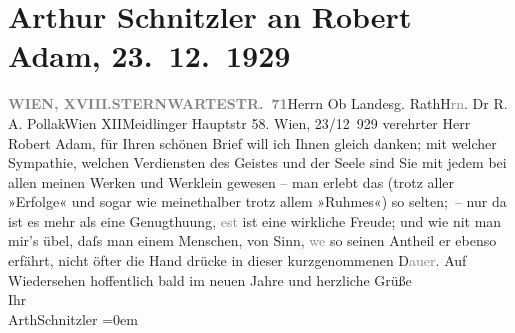 

         
         \renewcommand{\erwaehntePersonen}{Personen: Robert Adam}
         \renewcommand{\erwaehnteOrte}{Orte: Meidlinger Hauptstraße, Sternwartestraße 71, Wien, XII., Meidling, XVIII., Währing}
         \renewcommand{\erwaehnteWerke}{}
               \section[Arthur Schnitzler an Robert Adam, 23. 12. 1929]{ Arthur Schnitzler an Robert Adam, 23. 12. 1929}\nopagebreak{}\rehead{ }\begin{ledgroupsized}[t]{13cm}\normalsize\beginnumbering{} \toendnotes[C]{\smallbreak\pagebreak[2]} 
\toendnotes[C]{\smallbreak}\pstart{}{\pb}\label{T_L02528-1v}\label{T_L02528-1h}\pend{}\pstart{}\textcolor{gray}{\textbf{WIEN, XVIII.}}\pend{}\pstart{}\textcolor{gray}{\textbf{STERNWARTESTR. 71}}\pend{}{\bigskip}\pstart{}Herrn Ob Landesg. Rath\pend{}\pstart{}H\textcolor{gray}{rn}. Dr R. A. Pollak\pend{}\pstart{}Wien XII\pend{}\pstart{}Meidlinger Hauptstr 58.\pend{}{\bigskip}\pstart
           \raggedleft{}{\pb}Wien, 23/12 929\pend
           \pstart
           verehrter Herr Robert Adam, für Ihren schönen Brief will ich Ihnen
               gleich danken; mit welcher Sympathie, welchen Verdiensten des Geistes und der Seele
               sind Sie mit jedem bei allen meinen Werken und Werklein gewesen – man erlebt das
               (trotz aller »Erfolge« und sogar wie meinethalber trotz allem »Ruhmes«) so selten; –
               nur da{\geminationn} ist es mehr als eine Genugthuung,
                  \textcolor{gray}{est} ist eine wirkliche Freude; und wie ni{\geminationm}t man mir’s übel, daſs {\pb}man
               einem Menschen, von Sinn, \introOben{}\textcolor{gray}{we{\geminationn}}\introOben{} so seinen Antheil er ebenso erfährt, nicht öfter die Hand drücke in dieser
               kurzgenommenen D\textcolor{gray}{auer}.\pend
           \pstart
           Auf Wiedersehen hoffentlich bald im neuen Jahre und herzliche Grüße{\\[\baselineskip]}Ihr{\\[\baselineskip]}\spacefill\mbox{ArthSchnitzler}\pend
           \leftskip=0em{}
         

\end{ledgroupsized}
